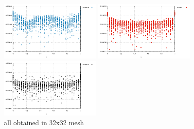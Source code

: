 \begin{center}
\includegraphics[width=5cm]{python_codes/fieldstone_12/results/rand/q6_error}
\includegraphics[width=5cm]{python_codes/fieldstone_12/results/rand/q7_error}
\includegraphics[width=5cm]{python_codes/fieldstone_12/results/rand/q8_error}\\
{\captionfont all obtained in 32x32 mesh}
\end{center}

